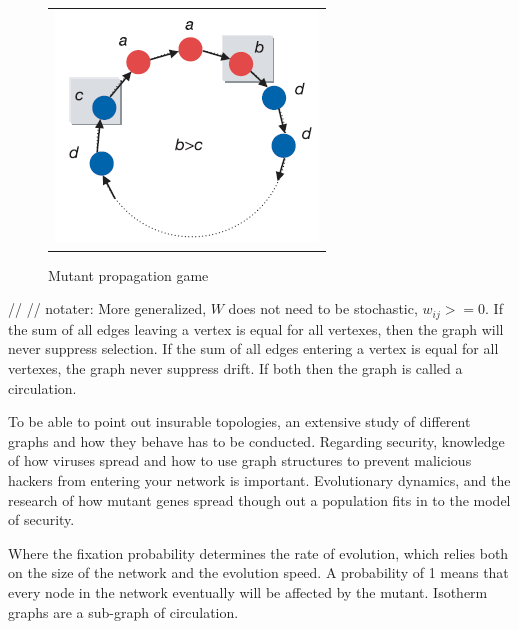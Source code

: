 \begin{figure}
\centering
\begin{tabular}{@{}c@{}}
\includegraphics[width=1.0\textwidth]{natureGameSingle.png}
\end{tabular}
\caption{\label{fig:game} Mutant propagation game}
\end{figure}




//
//
 notater:
More generalized, $W$ does not need to be stochastic, $w_{ij}>=0$. 
If the sum of all edges leaving a vertex is equal for all vertexes, then the graph will never suppress selection.
If the sum of all edges entering a vertex is equal for all vertexes, the graph never suppress drift.
If both then the graph is called a circulation.
     
To be able to point out insurable topologies, an extensive study of different graphs and how they behave has to be conducted. Regarding security, knowledge of how viruses spread and how to use graph structures to prevent malicious hackers from entering your network is important. Evolutionary dynamics, and the research of how mutant genes spread though out a population fits in to the model of security. 

Where the fixation probability determines the rate of evolution, which relies both on the size of the network and the evolution speed. A probability of 1 means that every node in the network eventually will be affected by the mutant.   
Isotherm graphs are a sub-graph of circulation. 

